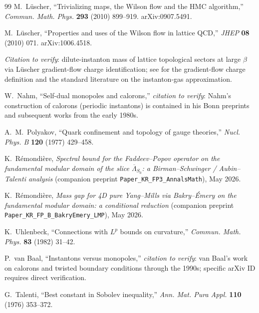 \documentclass[11pt,a4paper]{amsart}
\theoremstyle{definition}
\begin{document}
\begin{thebibliography}{99}
M.~L\"uscher,
``Trivializing maps, the Wilson flow and the HMC algorithm,''
\emph{Commun. Math. Phys.} \textbf{293} (2010) 899--919.
arXiv:0907.5491.

M.~L\"uscher,
``Properties and uses of the Wilson flow in lattice QCD,''
\emph{JHEP} \textbf{08} (2010) 071.
arXiv:1006.4518.

\emph{Citation to verify}: dilute-instanton mass of lattice topological
sectors at large $\beta$ via L\"uscher gradient-flow charge
identification; see \cite{Luscher2010WilsonFlow} for the gradient-flow
charge definition and the standard literature on the instanton-gas
approximation.

W.~Nahm,
``Self-dual monopoles and calorons,''
\emph{citation to verify}: Nahm's construction of calorons (periodic
instantons) is contained in his Bonn preprints and subsequent works
from the early 1980s.

A.~M.~Polyakov,
``Quark confinement and topology of gauge theories,''
\emph{Nucl. Phys. B} \textbf{120} (1977) 429--458.

K.~R\'emondi\`ere,
\emph{Spectral bound for the Faddeev--Popov operator on the fundamental
modular domain of the slice $\overline\Lambda_{S_0}$: a Birman--Schwinger /
Aubin--Talenti analysis} (companion preprint
\texttt{Paper\_KR\_FP3\_AnnalsMath}), May 2026.

K.~R\'emondi\`ere,
\emph{Mass gap for 4D pure Yang--Mills via Bakry--\'Emery on the
fundamental modular domain: a conditional reduction} (companion preprint
\texttt{Paper\_KR\_FP\_B\_BakryEmery\_LMP}), May 2026.

K.~Uhlenbeck,
``Connections with $L^p$ bounds on curvature,''
\emph{Commun. Math. Phys.} \textbf{83} (1982) 31--42.

P.~van Baal,
``Instantons versus monopoles,''
\emph{citation to verify}: van Baal's work on calorons and twisted
boundary conditions through the 1990s; specific arXiv ID requires
direct verification.

G.~Talenti,
``Best constant in Sobolev inequality,''
\emph{Ann. Mat. Pura Appl.} \textbf{110} (1976) 353--372.

\end{thebibliography}
\end{document}
